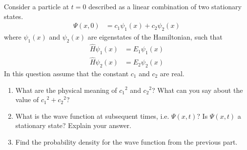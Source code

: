 \documentclass[fleqn, a4paper, 11pt, oneside]{amsart}
\theoremstyle{definition}
\theoremstyle{theorem}
\begin{document}
\begin{question}
	Consider a particle at $t = 0$ described as a linear combination of two stationary states.
	\begin{align*}
		\Psi(x,0) & = c_1 \psi_1(x) + c_2 \psi_2(x)
	\end{align*}
	where $\psi_1(x)$ and $\psi_2(x)$ are eigenstates of the Hamiltonian, such that
	\begin{align*}
		\hat{H} \psi_1(x) & = E_1 \psi_1(x) \\
		\hat{H} \psi_2(x) & = E_2 \psi_2(x)
	\end{align*}
	In this question assume that the constant $c_1$ and $c_2$ are real.
	\begin{enumerate}
		\item
			What are the physical meaning of ${c_1}^2$ and ${c_2}^2$?
			What can you say about the value of ${c_1}^2 + {c_2}^2$?
		\item
			What is the wave function at subsequent times, i.e. $\Psi(x,t)$?
			Is $\Psi(x,t)$ a stationary state?
			Explain your answer.
		\item
			Find the probability density for the wave function from the previous part.
	\end{enumerate}
\end{question}
\end{document}
